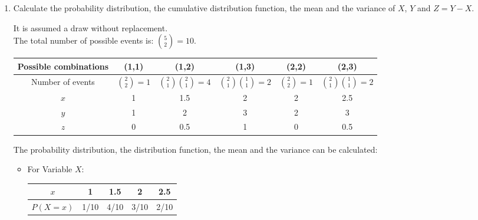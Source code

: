 \documentclass[12pt,thmsa]{article}
\begin{document}
\begin{enumerate}%
    \item Calculate the probability distribution, the cumulative distribution function, the mean and the variance of $X$, $Y$ and $Z = Y - X$. 

\medskip

It is assumed a draw without replacement.\\
  The total number of possible events is: $\binom{5}{2}=10$.
	\begin{center}
         	\begin{tabular}{|c|c|c|c|c|c|}
					\hline
 				 	Possible combinations & (1,1) & (1,2) & (1,3) & (2,2) & (2,3)\\[1mm]
					\hline
						Number of events & $\binom{2}{2}=1$ & $\binom{2}{1}\binom{2}{1}=4$ & $\binom{2}{1}\binom{1}{1}=2$ &  $\binom{2}{2} =1$ & 			 	          $\binom{2}{1}\binom{1}{1}=2$\\[1mm]
					\hline
												$x$ & 1 & 1.5 & 2 & 2 & 2.5\\[1mm]
					\hline
												$y$ & 1 & 2 & 3 & 2 & 3\\[1mm]
					\hline
												$z$ & 0 & 0.5 & 1 & 0 & 0.5\\[1mm]
					\hline
					
					\end{tabular}
         	\end{center}

The probability distribution, the distribution function, the mean and the variance can be calculated:

\begin{itemize}

\item 		For Variable $X$:
			
			\begin{center}
			\begin{tabular}{|c|c|c|c|c|}
			\hline
			$x$ & 1 & 1.5 & 2 & 2.5\\
			\hline
			$P(X=x)$ & 1/10 & 4/10 & 3/10 & 2/10\\
			\hline
			\end{tabular}
			\end{center}


\end{itemize}
\end{enumerate}
\end{document}
